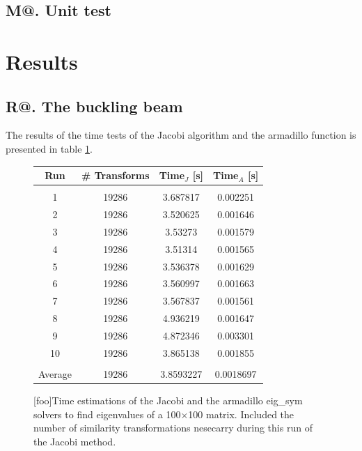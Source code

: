 \documentclass[%
reprint,
amsmath, 
amssymb, 
aps,]{revtex4-1}
\makeatletter
\newcommand*{\rom}[1]{\expandafter\@slowromancap\romannumeral #1@}
\makeatother
\begin{document}
		\subsection{M\rom{5}. Unit test} \noindent

\newpage 

	\section*{Results}
		\subsection*{R\rom{1}. The buckling beam} \noindent 
The results of the time tests of the Jacobi algorithm and the armadillo function is presented in table \ref{tab1}.
			\begin{figure}[H]
\centering 
				\begin{tabular} {|c|c|c|c|}
\hline
Run & \# Transforms & Time$_J$ [s] & Time$_A$ [s] \\ 
\hline
 &  &  & \\ 
 1 & 19286 & 3.687817             & 0.002251            \\ 
 2 & 19286 & 3.520625             & 0.001646            \\ 
 3 & 19286 & 3.53273             & 0.001579            \\ 
 4 & 19286 & 3.51314             & 0.001565            \\ 
 5 & 19286 & 3.536378             & 0.001629            \\ 
 6 & 19286 & 3.560997             & 0.001663            \\ 
 7 & 19286 & 3.567837             & 0.001561            \\ 
 8 & 19286 & 4.936219             & 0.001647            \\ 
 9 & 19286 & 4.872346             & 0.003301            \\ 
10 & 19286 & 3.865138             & 0.001855            \\ 
\hline 
 &  &  & \\
Average &19286& 3.8593227&0.0018697\\ 
\hline
				\end{tabular}
[foo]{Time estimations of the Jacobi and the armadillo eig\_sym solvers to find eigenvalues of a 100$\times$100 matrix. Included the number of similarity transformations nesecarry during this run of the Jacobi method. \label{tab1}}
			\end{figure}
\end{document}
